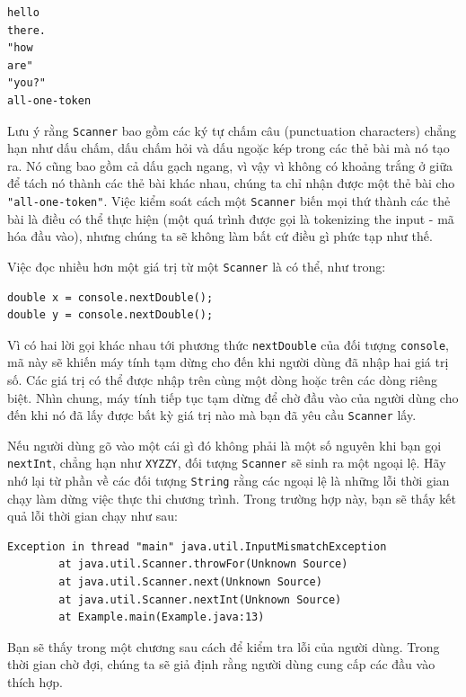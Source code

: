\begin{verbatim}
hello
there.
"how
are"
"you?"
all-one-token
\end{verbatim}

Lưu ý rằng \texttt{Scanner} bao gồm các ký tự chấm câu (punctuation
characters) chẳng hạn như dấu chấm, dấu chấm hỏi và dấu ngoặc kép trong
các thẻ bài mà nó tạo ra. Nó cũng bao gồm cả dấu gạch ngang, vì vậy vì
không có khoảng trắng ở giữa để tách nó thành các thẻ bài khác nhau,
chúng ta chỉ nhận được một thẻ bài cho \texttt{"all-one-token"}. Việc
kiểm soát cách một \texttt{Scanner} biến mọi thứ thành các thẻ bài là
điều có thể thực hiện (một quá trình được gọi là tokenizing the input -
mã hóa đầu vào), nhưng chúng ta sẽ không làm bất cứ điều gì phức tạp như
thế.

Việc đọc nhiều hơn một giá trị từ một \texttt{Scanner} là có thể, như
trong:

\begin{verbatim}
double x = console.nextDouble();
double y = console.nextDouble();
\end{verbatim}

Vì có hai lời gọi khác nhau tới phương thức \texttt{nextDouble} của đối
tượng \texttt{console}, mã này sẽ khiến máy tính tạm dừng cho đến khi
người dùng đã nhập hai giá trị số. Các giá trị có thể được nhập trên
cùng một dòng hoặc trên các dòng riêng biệt. Nhìn chung, máy tính tiếp
tục tạm dừng để chờ đầu vào của người dùng cho đến khi nó đã lấy được
bất kỳ giá trị nào mà bạn đã yêu cầu \texttt{Scanner} lấy.

Nếu người dùng gõ vào một cái gì đó không phải là một số nguyên khi bạn
gọi \texttt{nextInt}, chẳng hạn như \texttt{XYZZY}, đối tượng
\texttt{Scanner} sẽ sinh ra một ngoại lệ. Hãy nhớ lại từ phần về các đối
tượng \texttt{String} rằng các ngoại lệ là những lỗi thời gian chạy làm
dừng việc thực thi chương trình. Trong trường hợp này, bạn sẽ thấy kết
quả lỗi thời gian chạy như sau:

\begin{verbatim}
Exception in thread "main" java.util.InputMismatchException 
        at java.util.Scanner.throwFor(Unknown Source) 
        at java.util.Scanner.next(Unknown Source) 
        at java.util.Scanner.nextInt(Unknown Source) 
        at Example.main(Example.java:13)
\end{verbatim}

Bạn sẽ thấy trong một chương sau cách để kiểm tra lỗi của người dùng.
Trong thời gian chờ đợi, chúng ta sẽ giả định rằng người dùng cung cấp
các đầu vào thích hợp.

